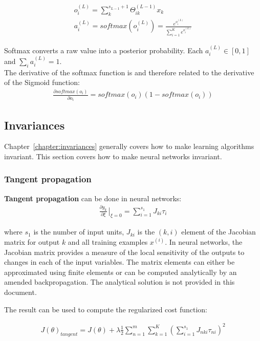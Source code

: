 \documentclass{report}
\begin{document}
\begin{align*}
o_i^{(L)} = \sum_k^{s_{L-1}+1} \Theta_{ik}^{(L-1)}x_k \\
a_i^{(L)} = softmax(o_i^{(L)}) = \frac{e^{o_i^{(L)}}}{\sum_{i=1}^{K} e^{o_i^{(L)}}}
\end{align*}

Softmax converts a raw value into a posterior probability.
Each $a_i^{(L)} \in [0,1]$ and $\sum_i a_i^{(L)} = 1$.\\
The derivative of the softmax function is and therefore related to the derivative of the Sigmoid function:
\begin{align*}
\frac{\partial softmax(o_i)}{\partial o_i} = softmax(o_i)(1-softmax(o_i))
\end{align*}

\subsection{Invariances}
\label{chapter:nninvariances}
Chapter~\ref{chapter:invariances} generally covers how to make learning algorithms invariant. This section covers how to make neural networks invariant.
\\
\subsubsection{Tangent propagation}
{\bf Tangent propagation} can be done in neural networks:
\begin{align*}
\frac{\partial y_k}{\partial \xi}\left.{\!\!\frac{}{}}\right |_{\xi=0} = \sum_{i=1}^{s_1} J_{ki}\tau_{i}
\end{align*}

where $s_1$ is the number of input units, $J_{ki}$ is the $(k,i)$ element of the Jacobian matrix for output $k$ and all training examples $x^{(i)}$.
In neural networks, the Jacobian matrix provides a measure of the local sensitivity of the outputs to changes in each of the input variables.
The matrix elements can either be approximated using finite elements or can be computed analytically by an amended backpropagation.
The analytical solution is not provided in this document.

The result can be used to compute the regularized cost function:

\begin{align*}
J(\theta)_{tangent} = J(\theta) + \lambda \frac{1}{2} \sum_{n=1}^{m} \sum_{k=1}^{K} (\sum_{i=1}^{s_1} J_{nki}\tau_{ni})^2
\end{align*}
\end{document}

